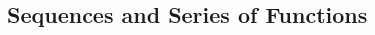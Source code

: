 \documentclass[reqno]{amsbook}
\begin{document}
\begin{preview}
	\addtocounter{section}{4}

	\Newpage
	
	\addtocounter{chapter}{6}


	\Newpage
	\chapter{Sequences and Series of Functions}

	\addtocounter{section}{3}

	\Newpage
	


	\Newpage
	\begin{thebibliography}{99}
		\bibbloch
	\end{thebibliography}

\end{preview}
\end{document}
